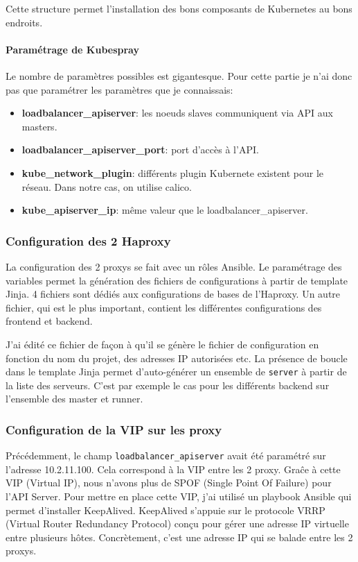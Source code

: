 \documentclass[12pt]{article}
\begin{document}
Cette structure permet l'installation des bons composants de \gls{Kubernetes} au bons endroits.

\paragraph{Paramétrage de \gls{Kubespray}}
Le nombre de paramètres possibles est gigantesque.
Pour cette partie je n'ai donc pas que paramétrer les paramètres que je connaissais:
\begin{itemize}
    \item \textbf{loadbalancer\_apiserver}: les noeuds slaves communiquent via \gls{API} aux masters.
    \item \textbf{loadbalancer\_apiserver\_port}: port d'accès à l'\gls{API}.
    \item \textbf{kube\_network\_plugin}: différents plugin Kubernete existent pour le réseau.
    Dans notre cas, on utilise calico.
    \item \textbf{kube\_apiserver\_ip}: même valeur que le loadbalancer\_apiserver.
\end{itemize}

\subsubsection{Configuration des 2 Haproxy}
La configuration des 2 proxys se fait avec un rôles \gls{Ansible}.
Le paramétrage des variables permet la génération des fichiers de configurations à partir de template \gls{Jinja}.
4 fichiers sont dédiés aux configurations de bases de l'Haproxy.
Un autre fichier, qui est le plus important, contient les différentes configurations des frontend et backend.

J'ai édité ce fichier de façon à qu'il se génère le fichier de configuration en fonction du nom du projet, des adresses \gls{IP} autorisées etc.
La présence de boucle dans le template \gls{Jinja} permet d'auto-générer un ensemble de \verb|server| à partir de la liste des serveurs.
C'est par exemple le cas pour les différents backend sur l'ensemble des master et runner.

\subsubsection{Configuration de la VIP sur les proxy}
Précédemment, le champ \verb|loadbalancer_apiserver| avait été paramétré sur l'adresse 10.2.11.100.
Cela correspond à la VIP entre les 2 proxy.
Graĉe à cette VIP (Virtual \gls{IP}), nous n'avons plus de SPOF (Single Point Of Failure) pour l'\gls{API} Server.
Pour mettre en place cette VIP, j'ai utilisé un playbook \gls{Ansible} qui permet d'installer KeepAlived.
KeepAlived s'appuie sur le protocole VRRP (Virtual Router Redundancy Protocol) conçu pour gérer une adresse \gls{IP} virtuelle entre plusieurs hôtes.
Concrètement, c'est une adresse \gls{IP} qui se balade entre les 2 proxys.
\end{document}
